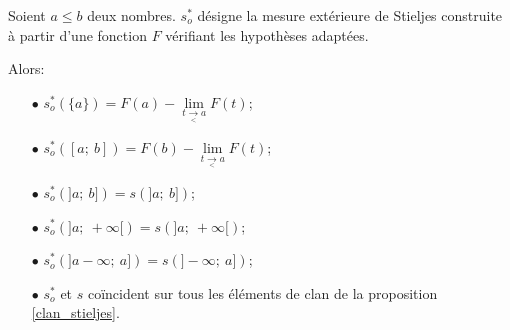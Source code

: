 \begin{prop}
\label{mesure_exterieure_stieljes}
Soient $a \leq b$ deux nombres. $s_o^{*}$ désigne la mesure extérieure de Stieljes construite à partir d'une fonction $F$ vérifiant les hypothèses adaptées.

Alors:
\begin{itemize}
\item[$\bullet$] $s_o^{*}\left(\{a\}\right) = F(a)-\lim \limits_{t \underset{<}{\to} a} F(t)$;
\item[$\bullet$] $s_o^{*}\left([a;~b]\right) = F(b)-\lim \limits_{t \underset{<}{\to} a} F(t)$;
\item[$\bullet$] $s_o^{*}\left(]a;~b]\right) = s\left(]a;~b]\right)$;
\item[$\bullet$] $s_o^{*}\left(]a;~+\infty[\right) = s\left(]a;~+\infty[\right)$;
\item[$\bullet$] $s_o^{*}\left(]a-\infty;~a]\right) = s\left(]-\infty;~a]\right)$;
\item[$\bullet$] $s_o^{*}$ et $s$ coïncident sur tous les éléments de clan de la proposition \ref{clan_stieljes}.
\end{itemize}

\end{prop}


